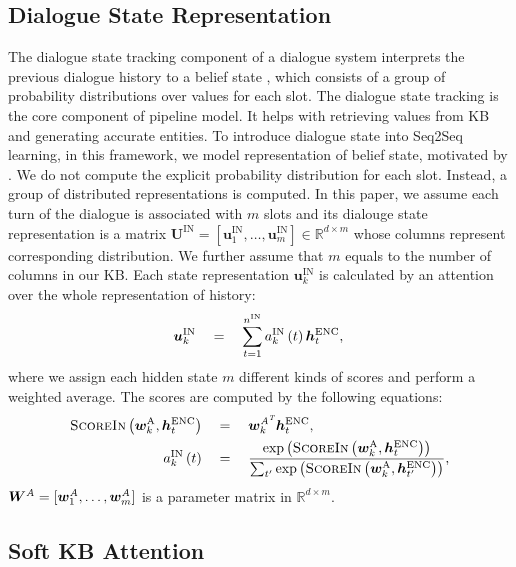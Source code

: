 \documentclass[11pt]{article}
\begin{document}
\subsection{Dialogue State Representation}
The dialogue state tracking component of a dialogue system interprets the previous dialogue history to 
a belief state \cite{williams:2013:SIGDial}, which consists of a group of probability distributions over 
values for each slot. The dialogue state tracking is the core component of pipeline model. It helps with retrieving values from KB and generating accurate entities. To introduce dialogue state into Seq2Seq learning, in this framework, we model representation of belief state, motivated by 
. We do not compute the explicit probability distribution for each 
slot. Instead, a group of distributed representations is computed. 
In this paper, we assume each turn of the dialogue is associated with $m$ slots and its dialouge state representation
is a matrix $\boldsymbol U^\text{IN} = \left[\boldsymbol u^\text{IN}_1, \ldots, \boldsymbol 
u^\text{IN}_m\right]\in \mathbb{R}^{d\times m}$ whose columns represent corresponding distribution.
We further assume that $m$ equals to the number of columns in our KB.
Each state representation $\boldsymbol{u}_k^{\text{IN}}$ is calculated 
by an attention over the whole representation of history:
\[
\boldsymbol u^\text{IN}_k\quad =\quad \sum_{t=1}^{n^\text{IN}}a^{\text{IN}}_{k}\left(t\right) \boldsymbol h^\text{ENC}_t,\\
\]
where we assign each hidden state $m$ different kinds of scores and perform a weighted average. The 
scores are computed by the following equations:
\begin{align*}
\textsc{ScoreIn}\left(\boldsymbol w^{\text A}_k, \boldsymbol h^\text{ENC}_t\right)\quad &=\quad \boldsymbol w^{\textit A^\textit T}_k \boldsymbol h^\text{ENC}_t,\\
a^{\text{IN}}_k\left(t\right)\quad  &=\quad \frac{\exp\left(\textsc{ScoreIn}\left(\boldsymbol w^{\text A}_k, \boldsymbol h^\text{ENC}_t\right)\right)}{\sum_{t'}\exp\left(\textsc{ScoreIn}\left(\boldsymbol w^{\text A}_k, \boldsymbol h^\text{ENC}_{t'}\right)\right)},
\end{align*}
$\boldsymbol W^{\textit A} = [\boldsymbol w^{\textit A}_1, \ldots, \boldsymbol w^{\textit A}_m]$ is a 
parameter matrix in $\mathbb{R}^{d\times m}$.

\subsection{Soft KB Attention}
\end{document}
